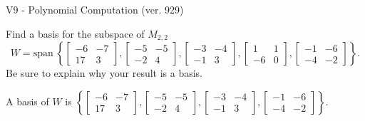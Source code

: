 \begin{exercise}
  \begin{exerciseTitle}V9 - Polynomial Computation (ver. 929)\end{exerciseTitle}
  \begin{exerciseStatement}
    Find a basis for the subspace of \(M_{2,2}\) 
\[W=\mathrm{span}\ \left\{\left[\begin{array}{cc}
-6 & -7 \\
17 & 3
\end{array}\right] , \left[\begin{array}{cc}
-5 & -5 \\
-2 & 4
\end{array}\right] , \left[\begin{array}{cc}
-3 & -4 \\
-1 & 3
\end{array}\right] , \left[\begin{array}{cc}
1 & 1 \\
-6 & 0
\end{array}\right] , \left[\begin{array}{cc}
-1 & -6 \\
-4 & -2
\end{array}\right]\right\}.\]
 Be sure to explain why your result is a basis.


  \end{exerciseStatement}
  \begin{exerciseAnswer}
   A basis of \(W\) is  \(\left\{\left[\begin{array}{cc}
-6 & -7 \\
17 & 3
\end{array}\right] , \left[\begin{array}{cc}
-5 & -5 \\
-2 & 4
\end{array}\right] , \left[\begin{array}{cc}
-3 & -4 \\
-1 & 3
\end{array}\right] , \left[\begin{array}{cc}
-1 & -6 \\
-4 & -2
\end{array}\right]\right\}\).
  


  \end{exerciseAnswer}
\end{exercise}
